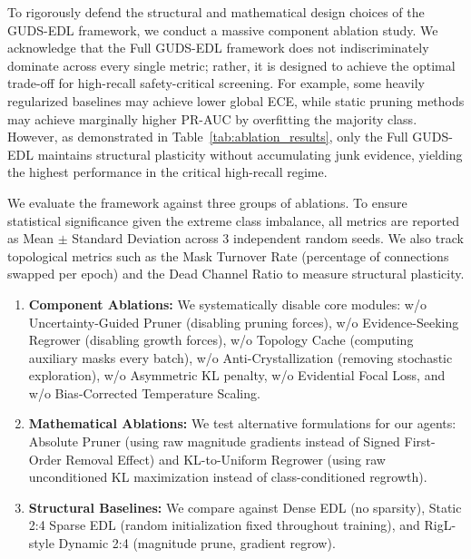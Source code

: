 \documentclass[letterpaper]{article} %
\begin{document}
To rigorously defend the structural and mathematical design choices of the GUDS-EDL framework, we conduct a massive component ablation study. We acknowledge that the Full GUDS-EDL framework does not indiscriminately dominate across every single metric; rather, it is designed to achieve the optimal trade-off for high-recall safety-critical screening. For example, some heavily regularized baselines may achieve lower global ECE, while static pruning methods may achieve marginally higher PR-AUC by overfitting the majority class. However, as demonstrated in Table~\ref{tab:ablation_results}, only the Full GUDS-EDL maintains structural plasticity without accumulating junk evidence, yielding the highest performance in the critical high-recall regime.

We evaluate the framework against three groups of ablations. To ensure statistical significance given the extreme class imbalance, all metrics are reported as Mean $\pm$ Standard Deviation across 3 independent random seeds. We also track topological metrics such as the Mask Turnover Rate (percentage of connections swapped per epoch) and the Dead Channel Ratio to measure structural plasticity.

\begin{enumerate}
    \item \textbf{Component Ablations:} We systematically disable core modules: w/o Uncertainty-Guided Pruner (disabling pruning forces), w/o Evidence-Seeking Regrower (disabling growth forces), w/o Topology Cache (computing auxiliary masks every batch), w/o Anti-Crystallization (removing stochastic exploration), w/o Asymmetric KL penalty, w/o Evidential Focal Loss, and w/o Bias-Corrected Temperature Scaling.
    \item \textbf{Mathematical Ablations:} We test alternative formulations for our agents: Absolute Pruner (using raw magnitude gradients instead of Signed First-Order Removal Effect) and KL-to-Uniform Regrower (using raw unconditioned KL maximization instead of class-conditioned regrowth).
    \item \textbf{Structural Baselines:} We compare against Dense EDL (no sparsity), Static 2:4 Sparse EDL (random initialization fixed throughout training), and RigL-style Dynamic 2:4 (magnitude prune, gradient regrow).
\end{enumerate}
\end{document}
